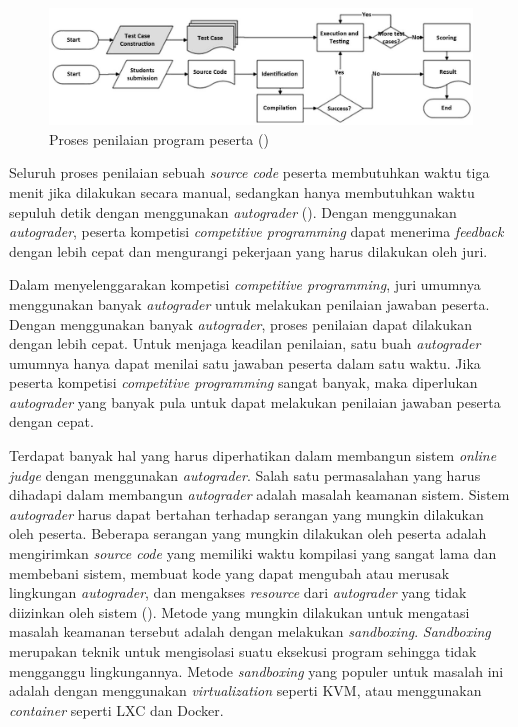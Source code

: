 \begin{figure}
	\centering
	\includegraphics[width=\textwidth]{images/grading-process}
	\caption{Proses penilaian program peserta (\cite{danutamalms})}
	\label{fig:grading-process}
\end{figure}

\par Seluruh proses penilaian sebuah \textit{source code} peserta membutuhkan waktu tiga menit jika dilakukan secara manual, sedangkan hanya membutuhkan waktu sepuluh detik dengan menggunakan \textit{autograder} (\cite{danutamalms}). Dengan menggunakan \textit{autograder}, peserta kompetisi \textit{competitive programming} dapat menerima \textit{feedback} dengan lebih cepat dan mengurangi pekerjaan yang harus dilakukan oleh juri.

\par Dalam menyelenggarakan kompetisi \textit{competitive programming}, juri umumnya menggunakan banyak \textit{autograder} untuk melakukan penilaian jawaban peserta. Dengan menggunakan banyak \textit{autograder}, proses penilaian dapat dilakukan dengan lebih cepat. Untuk menjaga keadilan penilaian, satu buah \textit{autograder} umumnya hanya dapat menilai satu jawaban peserta dalam satu waktu. Jika peserta kompetisi \textit{competitive programming} sangat banyak, maka diperlukan \textit{autograder} yang banyak pula untuk dapat melakukan penilaian jawaban peserta dengan cepat.

\par Terdapat banyak hal yang harus diperhatikan dalam membangun sistem \textit{online judge} dengan menggunakan \textit{autograder}. Salah satu permasalahan yang harus dihadapi dalam membangun \textit{autograder} adalah masalah keamanan sistem. Sistem \textit{autograder} harus dapat bertahan terhadap serangan yang mungkin dilakukan oleh peserta. Beberapa serangan yang mungkin dilakukan oleh peserta adalah mengirimkan \textit{source code} yang memiliki waktu kompilasi yang sangat lama dan membebani sistem, membuat kode yang dapat mengubah atau merusak lingkungan \textit{autograder}, dan mengakses \textit{resource} dari \textit{autograder} yang tidak diizinkan oleh sistem (\cite{wasikojsurvey}). Metode yang mungkin dilakukan untuk mengatasi masalah keamanan tersebut adalah dengan melakukan \textit{sandboxing}. \textit{Sandboxing} merupakan teknik untuk mengisolasi suatu eksekusi program sehingga tidak mengganggu lingkungannya. Metode \textit{sandboxing} yang populer untuk masalah ini adalah dengan menggunakan \textit{virtualization} seperti KVM, atau menggunakan \textit{container} seperti LXC dan Docker.

